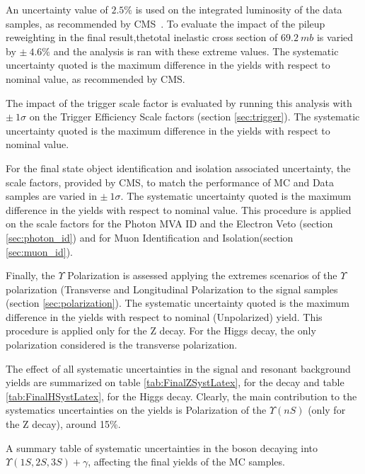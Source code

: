 An uncertainty value of $2.5\%$ is used on the integrated luminosity of the data samples, as recommended by CMS~\cite{CMS-PAS-LUM-17-001}. To evaluate the impact of the pileup reweighting in the final result,thetotal inelastic cross section of $69.2~mb$ is varied by $\pm~4.6\%$ and the analysis is ran with these extreme values. The systematic uncertainty quoted is the maximum difference in the yields with respect to nominal value, as recommended by CMS. 

The impact of the trigger scale factor is evaluated by running this analysis with $\pm~1\sigma$ on the Trigger Efficiency Scale factors (section \ref{sec:trigger}). The systematic uncertainty quoted is the maximum difference in the yields with respect to nominal value.

For the final state object identification and isolation associated uncertainty, the scale factors, provided by CMS, to match the performance of MC and Data samples are varied in  $\pm~1\sigma$. The systematic uncertainty quoted is the maximum difference in the yields with respect to nominal value. This procedure is applied on the scale factors for the Photon MVA ID and the Electron Veto (section \ref{sec:photon_id}) and for  Muon Identification and Isolation(section \ref{sec:muon_id}). 

Finally, the $\Upsilon$ Polarization is assessed applying the extremes scenarios of the $\Upsilon$ polarization (Transverse and Longitudinal Polarization to the signal samples (section \ref{sec:polarization}). The systematic uncertainty quoted is the maximum difference in the yields with respect to nominal (Unpolarized) yield. This procedure is applied only for the Z decay. For the Higgs decay, the only polarization considered is the transverse polarization.

The effect of all systematic uncertainties in the signal and resonant background yields are summarized on table \ref{tab:FinalZSystLatex}, for the \Z decay and table \ref{tab:FinalHSystLatex}, for the Higgs decay. Clearly, the main contribution to the systematics uncertainties on the yields is Polarization of the $\Upsilon(nS)$ (only for the Z decay), around 15\%.

\begin{table}[ht]
  \begin{center}
    \caption{ A summary table of systematic uncertainties in the \Z boson decaying into $\Upsilon(1S,2S,3S) + \gamma$, affecting the final yields of the MC samples.}
    
    \label{tab:FinalZSystLatex}
  \end{center}
\end{table}


